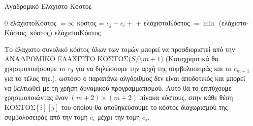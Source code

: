 \documentclass{article}
\begin{document}
\begin{algorithm}

\renewcommand{\algorithmicif}{\textbf{\foreignlanguage{greek}{Αν}}}
\renewcommand{\algorithmicfor}{\textbf{\foreignlanguage{greek}{Για}}}
\renewcommand{\algorithmicend}{\textbf{\foreignlanguage{greek}{Τέλος}}}
\renewcommand{\algorithmicdo}{}
\renewcommand{\algorithmicthen}{\textbf{\foreignlanguage{greek}{τότε}}}
\renewcommand{\algorithmicreturn}{\textbf{\foreignlanguage{greek}{Επίστρεψε}}}
\renewcommand{\algorithmicelse}{\textbf{\foreignlanguage{greek}{Αλλιώς}}}
\renewcommand{\algorithmicprocedure}{}

\caption{\foreignlanguage{greek}{Αναδρομικό Ελάχιστο Κόστος}} \label{alg:min_cost_recursive}
\begin{algorithmic}[1]
\State \Return $0$
\Else
\State \foreignlanguage{greek}{ελάχιστοΚόστος} $= \infty$
\State \foreignlanguage{greek}{κόστος} =  $ c_j - c_i +$  + 
\State \foreignlanguage{greek}{ελάχιστοΚόστος} $= \min$ (\foreignlanguage{greek}{ελάχιστοΚόστος}, \foreignlanguage{greek}{κόστος})
\EndFor
\State \Return \foreignlanguage{greek}{ελάχιστοΚόστος}
\EndIf
\EndProcedure
\end{algorithmic}    
\end{algorithm}
Το έλαχιστο συνολικό κόστος όλων των τομών μπορεί να προσδιοριστεί από την ΑΝΑΔΡΟΜΙΚΟ ΕΛΑΧΙΣΤΟ ΚΟΣΤΟΣ($S$,$0$,$m+1$) (Καταχρηστικά θα χρησιμοποιήσουμε τo $c_0$ για να δηλώσουμε την αρχή της συμβολοσειράς και τo $c_{m+1}$ για το τέλος της.), ωστόσο ο παραπάνω αλγόριθμος δεν είναι αποδοτικός και μπορεί να βελτιωθεί με τη χρήση δυναμικού προγραμματισμού. Αυτό θα το επιτύχουμε χρησιμοποιώντας έναν $(m+2) \times (m+2)$ πίνακα κόστους, στην κάθε θέση ΚΟΣΤΟΣ$[i][j]$ του οποίου θα αποθηκεύσουμε το κόστος διαχωρισμού της συμβολοσειράς από την τομή $c_i$ μέχρι την τομή $c_j$.
\end{document}
